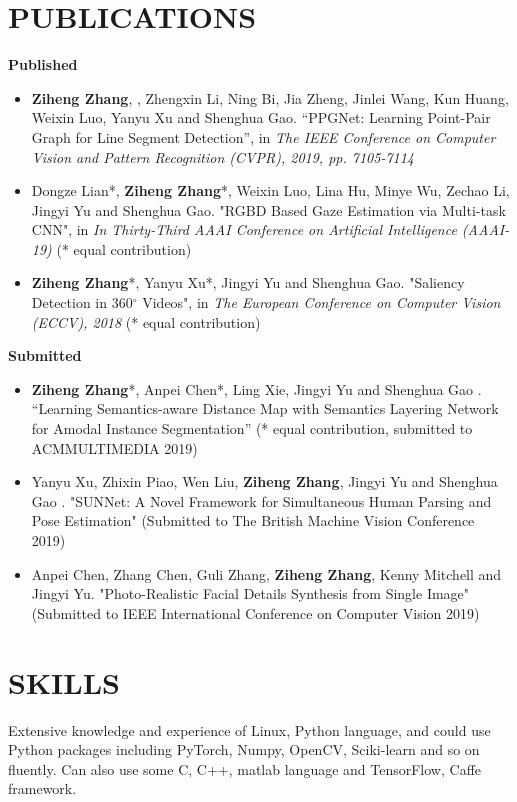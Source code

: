 \documentclass[11pt,a4paper,palatine]{moderncv}        %
\begin{document}
\begin{CJK*}{UTF8}{gbsn}
\section{PUBLICATIONS}
\textbf{Published}
  {\begin{itemize}
    \item  \textbf{Ziheng Zhang}, , Zhengxin Li, Ning Bi, Jia Zheng, Jinlei Wang, Kun Huang, Weixin Luo, Yanyu Xu and Shenghua Gao. “PPGNet: Learning Point-Pair Graph for Line Segment Detection”, in \textit{The IEEE Conference on Computer Vision and Pattern Recognition (CVPR), 2019, pp. 7105-7114}
    \item Dongze Lian*, \textbf{Ziheng Zhang}*, Weixin Luo, Lina Hu, Minye Wu, Zechao Li, Jingyi Yu and Shenghua Gao. "RGBD Based Gaze Estimation via Multi-task CNN", in \textit{In Thirty-Third AAAI Conference on Artificial Intelligence (AAAI-19)} (* equal contribution)
    \item \textbf{Ziheng Zhang}*, Yanyu Xu*, Jingyi Yu and Shenghua Gao. "Saliency Detection in 360$^\circ$ Videos", in \textit{The European Conference on Computer Vision (ECCV), 2018} (* equal contribution)
  \end{itemize}
  }
\textbf{Submitted}
  {\begin{itemize}
    \item  \textbf{Ziheng Zhang}*, Anpei Chen*, Ling Xie, Jingyi Yu and Shenghua Gao . “Learning Semantics-aware Distance Map with Semantics Layering Network for Amodal Instance Segmentation” (* equal contribution, submitted to ACMMULTIMEDIA 2019)
    \item Yanyu Xu, Zhixin Piao, Wen Liu, \textbf{Ziheng Zhang}, Jingyi Yu and Shenghua Gao . "SUNNet: A Novel Framework for Simultaneous Human Parsing and Pose Estimation" (Submitted to The British Machine Vision Conference 2019)
    \item Anpei Chen, Zhang Chen, Guli Zhang, \textbf{Ziheng Zhang}, Kenny Mitchell and Jingyi Yu. "Photo-Realistic Facial Details Synthesis from Single Image" (Submitted to IEEE International Conference on Computer Vision 2019)
  \end{itemize}
  }

\section{SKILLS}
    Extensive knowledge and experience of Linux, Python language, and could use Python packages including PyTorch, Numpy, OpenCV, Sciki-learn and so on fluently. Can also use some C, C++, matlab language and TensorFlow, Caffe framework.


\end{CJK*}
\end{document}
